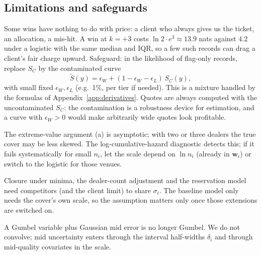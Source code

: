 \documentclass[11pt,a4paper]{article}
\theoremstyle{definition}
\theoremstyle{remark}
\begin{document}
\subsection{Limitations and safeguards}\label{sec:limitations}
\begin{description}[itemsep=3pt,leftmargin=0pt]
\item[Thin right tail and non-price wins.] Some wins have nothing to do with price: a client who always gives us the ticket, an allocation, a mis-hit. A win at $k=+3$ costs $\ln2\cdot e^{3}\approx 13.9$ nats against $4.2$ under a logistic with the same median and IQR, so a few such records can drag a client's fair charge upward. Safeguard: in the likelihood of flag-only records, replace $S_C$ by the contaminated curve
\[
\tilde S(y)=\epsilon_W+(1-\epsilon_W-\epsilon_L)\,S_C(y),
\]
with small fixed $\epsilon_W,\epsilon_L$ (e.g.\ 1\%, per tier if needed). This is a mixture handled by the formulas of Appendix~\ref{app:derivatives}. Quotes are always computed with the uncontaminated $S_C$: the contamination is a robustness device for estimation, and a curve with $\epsilon_W>0$ would make arbitrarily wide quotes look profitable.
\item[Small dealer counts.] The extreme-value argument (a) is asymptotic; with two or three dealers the true cover may be less skewed. The log-cumulative-hazard diagnostic detects this; if it fails systematically for small $n_i$, let the scale depend on $\ln n_i$ (already in $\bm w_i$) or switch to the logistic for those venues.
\item[Common scale.] Closure under minima, the dealer-count adjustment and the reservation model need competitors (and the client limit) to share $\sigma_i$. The baseline model only needs the cover's own scale, so the assumption matters only once those extensions are switched on.
\item[Mid noise.] A Gumbel variable plus Gaussian mid error is no longer Gumbel. We do not convolve; mid uncertainty enters through the interval half-widths $\delta_i$ and through mid-quality covariates in the scale.
\end{description}

\end{document}

